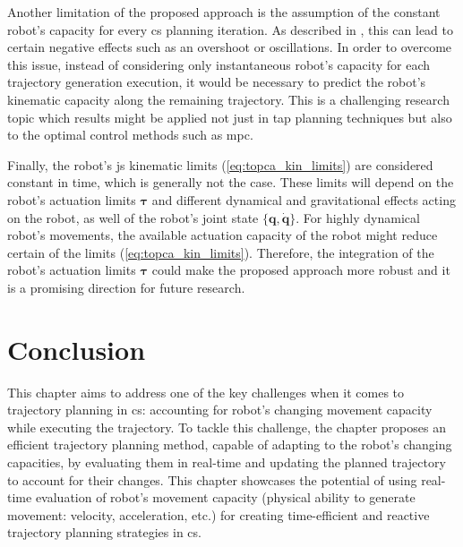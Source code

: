 Another limitation of the proposed approach is the assumption of the constant robot's capacity for every \gls{cs} planning iteration. As described in , this can lead to certain negative effects such as an overshoot or oscillations.  In order to overcome this issue, instead of considering only instantaneous robot's capacity for each trajectory generation execution, it would be necessary to predict the robot's kinematic capacity along the remaining trajectory. This is a challenging research topic which results might be applied not just in \gls{tap} planning techniques but also to the optimal control methods such as \gls{mpc}.  

Finally, the robot's \gls{js} kinematic limits (\ref{eq:topca_kin_limits}) are considered constant in time, which is generally not the case.
These limits will depend on the robot's actuation limits $\bm{\tau}$ and different dynamical and gravitational effects acting on the robot, as well of the robot's joint state $\{\bm{q},\dot{\bm{q}}\}$. For highly dynamical robot's movements, the available actuation capacity of the robot might reduce certain of the limits (\ref{eq:topca_kin_limits}). Therefore, the integration of the robot's actuation limits $\bm{\tau}$ could make the proposed approach more robust and it is a promising direction for future research. 

\section{Conclusion}

This chapter aims to address one of the key challenges when it comes to trajectory planning in \gls{cs}: accounting for robot's changing movement capacity while executing the trajectory. To tackle this challenge, the chapter proposes an efficient trajectory planning method, capable of adapting to the robot's changing capacities, by evaluating them in real-time and updating the planned trajectory to account for their changes. This chapter showcases the potential of using real-time evaluation of robot's movement capacity (physical ability to generate movement: velocity, acceleration, etc.) for creating time-efficient and reactive trajectory planning strategies in \gls{cs}. 

